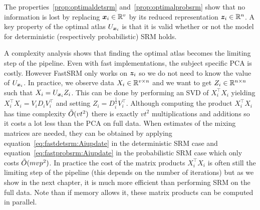 The properties~\ref{prop:optimaldetsrm} and~\ref{prop:optimalprobsrm} show that
no information is lost by replacing $\boldsymbol{x}_i \in \mathbb{R}^v$ by its reduced representation $\boldsymbol{z}_i \in \mathbb{R}^n$.
A key property of the optimal atlas $U_{\boldsymbol{x}_i}$ is that it is valid whether or
not the model for deterministic (respectively probabilistic) SRM holds.

A complexity analysis shows that finding the optimal atlas becomes the limiting
step of the pipeline. Even with fast implementations, the subject specific PCA
is costly. However FastSRM only works on $\boldsymbol{z}_i$ so we do not need to know the value of $U_{\boldsymbol{x}_i}$.
In practice, we observe data $X_i \in \mathbb{R}^{v \times n}$ and we want to get $Z_i
\in \mathbb{R}^{n \times n}$ such that $X_i = U_{\boldsymbol{x}_i} Z_i$. This can be done by performing an
SVD of $X_i^{\top} X_i$ yielding $X_i^{\top}X_i= V_i D_i V_i^{\top}$ and setting $Z_i = D_i^{\frac12} V_i^{\top}$.
Although computing the product $X_i^{\top} X_i$ has time complexity $\tilde{O}(vt^2)$ there is
exactly $vt^2$ multiplications and additions so it costs a lot less than the PCA
on full data. When estimates of the mixing matrices are needed, they can be obtained by
applying equation~\eqref{eq:fastdetsrm:Aiupdate} in the deterministic SRM case and
equation~\eqref{eq:fastprobsrm:Aiupdate} in the probabilistic SRM case which only costs
$\tilde{O}(mvp^2)$.
In practice the cost of the matrix products $X_i^{\top} X_i$ is often still the
limiting step of the pipeline (this depends on the number of iterations) but as
we show in the next chapter, it is much more efficient than performing SRM on
the full data. Note than if memory allows it, these matrix products can be
computed in parallel.



